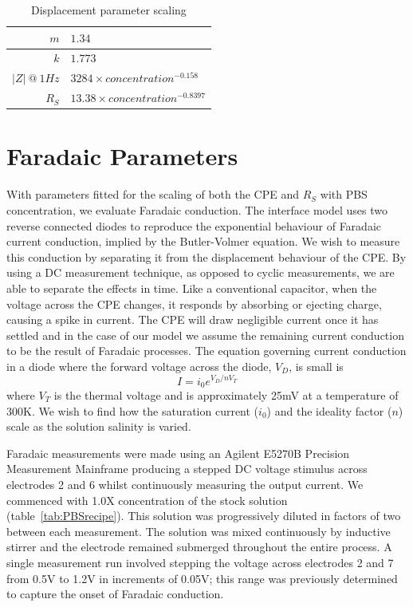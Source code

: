 \documentclass[journal, a4paper]{IEEEtran}
\begin{document}
\begin{table}
    \begin{center}
        \begin{tabular}{|r|l|}
            \hline
            $m$ & $1.34$ \\ \hline
            $k$ & $1.773$\\ \hline
            $|Z|\: @\: 1Hz$& $3284 \times concentration^{-0.158}$ \\ \hline
            $R_{S}$ & $13.38 \times concentration^{-0.8397} $\\ \hline
        \end{tabular}
    \end{center}
    \caption{Displacement parameter scaling}
    \label{tab:CPEparams}
\end{table}

\section{Faradaic Parameters}

With parameters fitted for the scaling of both the CPE and $R_{S}$ with PBS concentration, we evaluate Faradaic conduction. The interface model uses two reverse connected diodes to reproduce the exponential behaviour of Faradaic current conduction, implied by the Butler-Volmer equation. We wish to measure this conduction by separating it from the displacement behaviour of the CPE. By using a DC measurement technique, as opposed to cyclic measurements, we are able to separate the effects in time. Like a conventional capacitor, when the voltage across the CPE changes, it responds by absorbing or ejecting charge, causing a spike in current. The CPE will draw negligible current once it has settled and in the case of our model we assume the remaining current conduction to be the result of Faradaic processes. The equation governing current conduction in a diode where the forward voltage across the diode, $V_{D}$, is small is
\begin{equation}
    I = i_{0}  e^{V_{D} / n V_{T}}
\end{equation}
where $V_{T}$ is the thermal voltage and is approximately 25\thinspace mV at a temperature of 300\thinspace K. We wish to find how the saturation current ($i_{0}$) and the ideality factor ($n$) scale as the solution salinity is varied.

Faradaic measurements were made using an Agilent E5270B Precision Measurement Mainframe producing a stepped DC voltage stimulus across electrodes 2 and 6 whilst continuously measuring the output current. We commenced with 1.0X concentration of the stock solution (table~\ref{tab:PBSrecipe}). This solution was progressively diluted in factors of two between each measurement. The solution was mixed continuously by inductive stirrer and the electrode remained submerged throughout the entire process.
A single measurement run involved stepping the voltage across electrodes 2 and 7 from 0.5\thinspace V to 1.2\thinspace V in increments of 0.05\thinspace V; this range was previously determined to capture the onset of Faradaic conduction.
\end{document}
